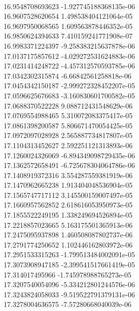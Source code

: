 { \\
16.9548708693623 -1.927745188368135e-06
 \\
16.9607528620654 1.498538404121064e-05
 \\
16.9697950068565 1.609563878446352e-05
 \\
16.9850624394633 7.410159241771908e-07
 \\
16.9983371224397 -9.258383215637878e-06
 \\
17.0137175857612 -4.029272531624883e-06
 \\
17.0231414248722 -4.457312570593785e-06
 \\
17.0342302315874 -6.66842561258818e-06
 \\
17.0454342150187 -2.999272328452207e-05
 \\
17.0596625676683 -3.160830601700582e-05
 \\
17.0688370522228 9.088712431548629e-06
 \\
17.0769554988465 5.310072083375417e-05
 \\
17.0861398200587 5.806671470054425e-05
 \\
17.0972097028928 2.565887734817807e-05
 \\
17.1104313452627 2.592251121313893e-06
 \\
17.1260024326069 -6.894349098729435e-06
 \\
17.1362572658491 -6.725678304064786e-06
 \\
17.1408919372316 3.554287559381919e-06
 \\
17.1470962665238 1.913404048536904e-05
 \\
17.1565747717112 3.145500159007497e-05
 \\
17.1660957562852 2.618616053950973e-05
 \\
17.1855522249195 1.338249694526894e-05
 \\
17.2218857023665 5.163175501365913e-06
 \\
17.2475095937898 1.460508087802737e-06
 \\
17.2791774250652 1.102446162803972e-06
 \\
17.2951533315263 -1.799513484002091e-05
 \\
17.3073908947185 -2.399541517661419e-05
 \\
17.314017495966 -1.745978988765273e-05
 \\
17.3207540054096 -5.334212801244576e-06
 \\
17.3243824058033 -9.519522791379131e-06
 \\
17.3278004636575 -7.57280668040039e-06
 \\
}
